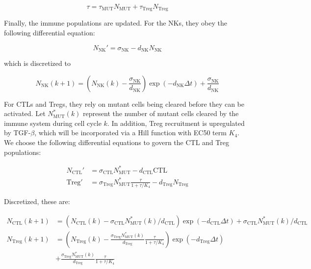 \documentclass[11pt]{article}
\begin{document}
\begin{equation}\tag{2.6}
\tau = \tau_{\text{MUT}}N_{\text{MUT}} + \tau_{\text{Treg}}N_{\text{Treg}}
\end{equation}


Finally, the immune populations are updated.
For the NKs, they obey the following differential equation:
 
\begin{equation}\tag{2.7}
N_{\text{NK}}' = \sigma_{\text{NK}} - d_{\text{NK}}N_{\text{NK}}
\end{equation}

which is discretized to
 
 \begin{equation}\tag{2.8}
N_{\text{NK}}(k+1) = \left (N_{\text{NK}}(k)-\frac{\sigma_{\text{NK}}}{d_{\text{NK}}} \right )\exp(-d_{\text{NK}}\Delta t)+\frac{\sigma_{\text{NK}}}{d_{\text{NK}}}
\end{equation}

For CTLs and Tregs, they rely on mutant cells being cleared before they can be activated.
Let $N_{\text{MUT}}^*(k)$ represent the number of mutant cells cleared by the immune system during cell cycle $k$.
In addition, Treg recruitment is upregulated by TGF-$\beta$, which will be incorporated via a Hill function with EC50 term $K_4$.
We choose the following differential equations to govern the CTL and Treg populations:

\begin{equation}\tag{2.9}
\begin{split}
N_\text{CTL}' & = \sigma_{\text{CTL}}N_{\text{MUT}}^* - d_{\text{CTL}}\text{CTL} \\
\text{Treg}' & = \sigma_{\text{Treg}}N_{\text{MUT}}^* \frac{\tau}{1+\tau/K_4}- d_{\text{Treg}}N_\text{Treg}
\end{split}
\end{equation}

Discretized, these are:

\begin{equation}\tag{2.10}
\begin{split}
N_\text{CTL}(k+1) & =  \left (N_\text{CTL}(k)-\sigma_{\text{CTL}}N_{\text{MUT}}^*(k)/d_{\text{CTL}}\right )\exp(- d_{\text{CTL}}\Delta t) + \sigma_{\text{CTL}}N_{\text{MUT}}^*(k)/d_{\text{CTL}}\\
N_\text{Treg}(k+1) & =  \left (N_\text{Treg}(k)-\frac{\sigma_{\text{Treg}}N_{\text{MUT}}^*(k)}{d_{\text{Treg}}} \frac{\tau}{1+\tau/K_4}\right )\exp(-d_{\text{Treg}}\Delta t)\\
&+ \frac{\sigma_{\text{Treg}}N_{\text{MUT}}^*(k)}{d_{\text{Treg}}} \frac{\tau}{1+\tau/K_4}
\end{split}
\end{equation}
\end{document}
